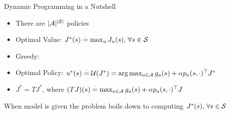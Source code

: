 \documentclass[10pt]{beamer}
\begin{document}
\begin{frame}[fragile]{Dynamic Programming in a Nutshell}
\begin{itemize}
\item There are $|\A|^{|\S|}$ policies
\item Optimal Value: $J^*(s)\eqdef\max_{u}J_u(s),\,\forall s\in \S$
\item Greedy: {\color{orange}{Best = Current Best+ Future Best}}
\item Optimal Policy: $u^*(s)\eqdef \U(J^*) =\arg\max_{a\in \A} g_a(s)+\alpha p_a(s,\cdot)^\top J^*$
\item $J^*=TJ^*$, where $(TJ)(s)\eqdef\max_{a\in \A} g_a(s)+\alpha p_a(s,\cdot)^\top J$
\end{itemize}

\begin{block}{}
When model is given the problem boils down to computing $J^*(s),\,\forall s\in \S$
\end{block}



\end{frame}
\end{document}
